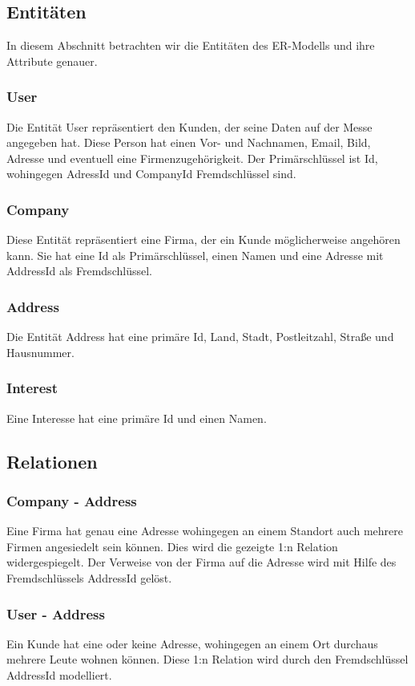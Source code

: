 \subsection{Entitäten}
In diesem Abschnitt betrachten wir die Entitäten des ER-Modells und ihre Attribute genauer.

\subsubsection{User}
Die Entität User repräsentiert den Kunden, der seine Daten auf der Messe angegeben hat. Diese Person hat einen Vor- und Nachnamen, Email, Bild, Adresse und eventuell eine Firmenzugehörigkeit. Der Primärschlüssel ist Id, wohingegen AdressId und CompanyId Fremdschlüssel sind.

\subsubsection{Company}
Diese Entität repräsentiert eine Firma, der ein Kunde möglicherweise angehören kann. Sie hat eine Id als Primärschlüssel, einen Namen und eine Adresse mit AddressId als Fremdschlüssel.

\subsubsection{Address}
Die Entität Address hat eine primäre Id, Land, Stadt, Postleitzahl, Straße und Hausnummer.

\subsubsection{Interest}
Eine Interesse hat eine primäre Id und einen Namen.

\subsection{Relationen}

\subsubsection{Company - Address}
Eine Firma hat genau eine Adresse wohingegen an einem Standort auch mehrere Firmen angesiedelt sein können. Dies wird die gezeigte 1:n Relation widergespiegelt. Der Verweise von der Firma auf die Adresse wird mit Hilfe des Fremdschlüssels AddressId gelöst.

\subsubsection{User - Address}
Ein Kunde hat eine oder keine Adresse, wohingegen an einem Ort durchaus mehrere Leute wohnen können. Diese 1:n Relation wird durch den Fremdschlüssel AddressId modelliert.

